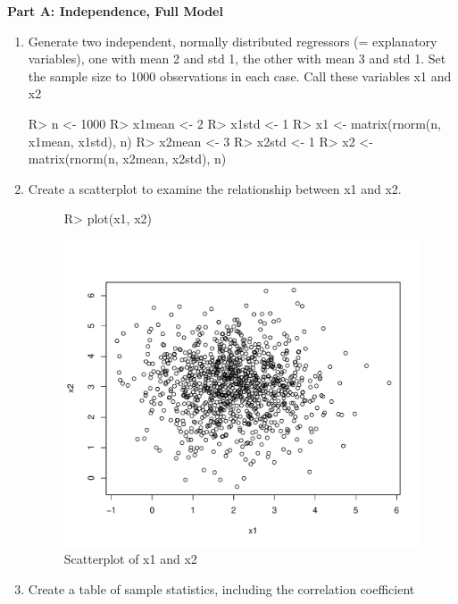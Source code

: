 \documentclass[11pt,reqno]{article}   %
\begin{document}
\textbf{Part A: Independence, Full Model}
\begin{enumerate}
\item
Generate two independent, normally distributed regressors (= explanatory variables), one with mean 2 and std 1,
the other with mean 3 and std 1.  Set the sample size to 1000 observations in each case. Call these variables
x1 and x2
\begin{Schunk}
\begin{Sinput}
R> n <- 1000
R> x1mean <- 2
R> x1std <- 1
R> x1 <- matrix(rnorm(n, x1mean, x1std), n)
R> x2mean <- 3
R> x2std <- 1
R> x2 <- matrix(rnorm(n, x2mean, x2std), n)
\end{Sinput}
\end{Schunk}
\newpage
\item Create a scatterplot to examine the relationship between x1 and x2.
\begin{figure}[!ht]
\centering
\begin{Schunk}
\begin{Sinput}
R> plot(x1, x2)
\end{Sinput}
\end{Schunk}
\includegraphics{ps1-chunk1-2}

\caption{Scatterplot of x1 and x2}
\label{fig:scatter}
\end{figure}

\item Create a table of sample statistics, including the correlation coefficient


\end{enumerate}
\end{document}
